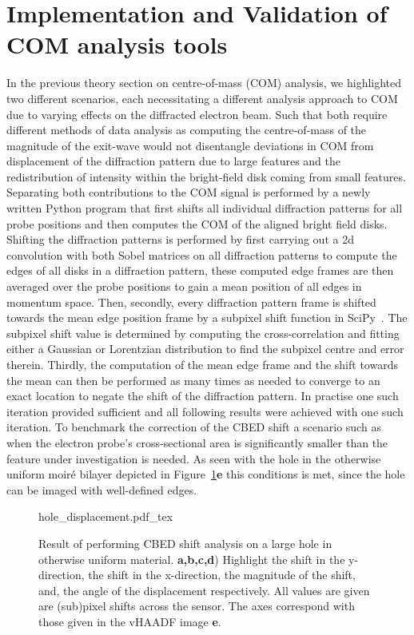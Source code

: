 \section{Implementation and Validation of COM analysis tools}


In the previous theory section on centre-of-mass (COM) analysis, we highlighted two different scenarios, each necessitating a different analysis approach to COM due to varying effects on the diffracted electron beam.
%
Such that both require different methods of data analysis as computing the centre-of-mass of the magnitude of the exit-wave would not disentangle deviations in COM from displacement of the diffraction pattern due to large features and the redistribution of intensity within the bright-field disk coming from small features.
%
Separating both contributions to the COM signal is performed by a newly written Python program that first shifts all individual diffraction patterns for all probe positions and then computes the COM of the aligned bright field disks.
%
Shifting the diffraction patterns is performed by first carrying out a 2d convolution with both Sobel matrices on all diffraction patterns to compute the edges of all disks in a diffraction pattern, these computed edge frames are then averaged over the probe positions to gain a mean position of all edges in momentum space.
%
Then, secondly, every diffraction pattern frame is shifted towards the mean edge position frame by a subpixel shift function in SciPy~\cite{2020SciPy-NMeth}. The subpixel shift value is determined by computing the cross-correlation and fitting either a Gaussian or Lorentzian distribution to find the subpixel centre and error therein.
%
Thirdly, the computation of the mean edge frame and the shift towards the mean can then be performed as many times as needed to converge to an exact location to negate the shift of the diffraction pattern. In practise one such iteration provided sufficient and all following results were achieved with one such iteration.
%
To benchmark the correction of the CBED shift a scenario such as when the electron probe's cross-sectional area is significantly smaller than the feature under investigation is needed. As seen with the hole in the otherwise uniform moiré bilayer depicted in Figure~\ref{fig:hole_dis}\textbf{e} this conditions is met, since the hole can be imaged with well-defined edges. 
%
\begin{figure}
    \centering
    \def\svgwidth{1\linewidth}
    {hole_displacement.pdf_tex}
    \caption{Result of performing CBED shift analysis on a large hole in otherwise uniform material. \textbf{a,b,c,d}) Highlight the shift in the y-direction, the shift in the x-direction, the magnitude of the shift, and, the angle of the displacement respectively. All values are given are (sub)pixel shifts across the sensor. The axes correspond with those given in the vHAADF image \textbf{e}.}
    \label{fig:hole_dis}
\end{figure}
